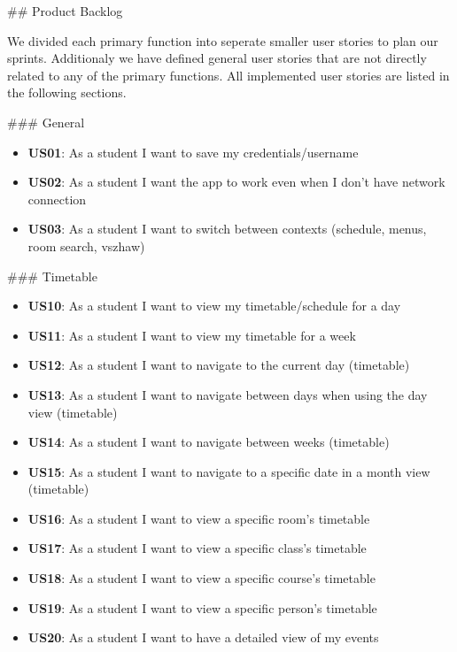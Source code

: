 \begin{markdown}
\newpage

## Product Backlog

We divided each primary function into seperate smaller user stories to plan our sprints. Additionaly we have defined general user stories that are not directly related to any of the primary functions. All implemented user stories are listed in the following sections.

### General

\begin{itemize}
  \item \textbf{US01}: As a student I want to save my credentials/username
  \item \textbf{US02}: As a student I want the app to work even when I don't have network connection
  \item \textbf{US03}: As a student I want to switch between contexts (schedule, menus, room search, vszhaw)
\end{itemize}

### Timetable

\begin{itemize}
  \item \textbf{US10}: As a student I want to view my timetable/schedule for a day
  \item \textbf{US11}: As a student I want to view my timetable for a week
  \item \textbf{US12}: As a student I want to navigate to the current day (timetable)
  \item \textbf{US13}: As a student I want to navigate between days when using the day view (timetable)
  \item \textbf{US14}: As a student I want to navigate between weeks (timetable)
  \item \textbf{US15}: As a student I want to navigate to a specific date in a month view (timetable)
  \item \textbf{US16}: As a student I want to view a specific room's timetable
  \item \textbf{US17}: As a student I want to view a specific class's timetable
  \item \textbf{US18}: As a student I want to view a specific course's timetable
  \item \textbf{US19}: As a student I want to view a specific person's timetable
  \item \textbf{US20}: As a student I want to have a detailed view of my events
\end{itemize}


\end{markdown}
